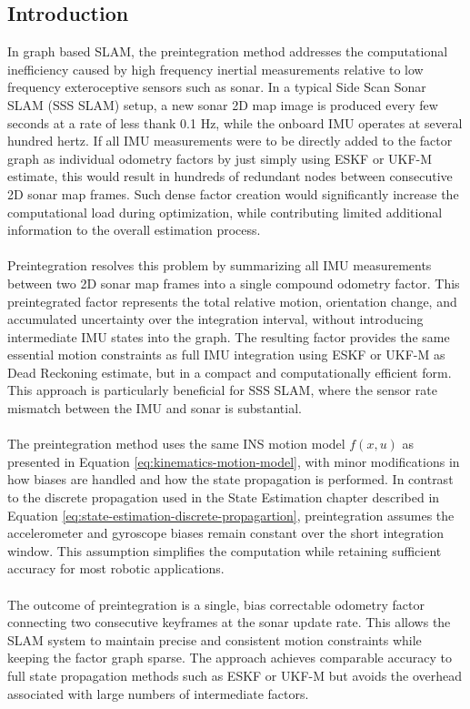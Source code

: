 \subsection{Introduction}
In graph based SLAM, the preintegration method addresses the computational inefficiency caused by high frequency inertial measurements relative to low frequency exteroceptive sensors such as sonar. In a typical Side Scan Sonar SLAM (SSS SLAM) setup, a new sonar 2D map image is produced every few seconds at a rate of less thank 0.1 Hz, while the onboard IMU operates at several hundred hertz. If all IMU measurements were to be directly added to the factor graph as individual odometry factors by just simply using ESKF or UKF-M estimate, this would result in hundreds of redundant nodes between consecutive 2D sonar map frames. Such dense factor creation would significantly increase the computational load during optimization, while contributing limited additional information to the overall estimation process.
\\ \\
Preintegration resolves this problem by summarizing all IMU measurements between two 2D sonar map frames into a single compound odometry factor. This preintegrated factor represents the total relative motion, orientation change, and accumulated uncertainty over the integration interval, without introducing intermediate IMU states into the graph. The resulting factor provides the same essential motion constraints as full IMU integration using ESKF or UKF-M as Dead Reckoning estimate, but in a compact and computationally efficient form. This approach is particularly beneficial for SSS SLAM, where the sensor rate mismatch between the IMU and sonar is substantial.
\\ \\
The preintegration method uses the same INS motion model $f(x,u)$ as presented in Equation \ref{eq:kinematics-motion-model}, with minor modifications in how biases are handled and how the state propagation is performed. In contrast to the discrete propagation used in the State Estimation chapter described in Equation \ref{eq:state-estimation-discrete-propagartion}, preintegration assumes the accelerometer and gyroscope biases remain constant over the short integration window. This assumption simplifies the computation while retaining sufficient accuracy for most robotic applications.
\\ \\
The outcome of preintegration is a single, bias correctable odometry factor connecting two consecutive keyframes at the sonar update rate. This allows the SLAM system to maintain precise and consistent motion constraints while keeping the factor graph sparse. The approach achieves comparable accuracy to full state propagation methods such as ESKF or UKF-M but avoids the overhead associated with large numbers of intermediate factors.
